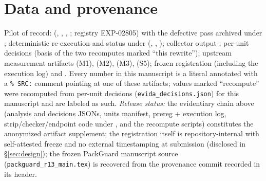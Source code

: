 \documentclass[sigconf,nonacm]{acmart}
\begin{document}
\section*{Data and provenance}
\begin{sloppypar}
Pilot of record: 
(, ,
, ;
registry EXP-02805) with the defective pass archived under
; deterministic re-execution and status under
 (,
, ); collector
output ; per-unit decisions
 (basis of the two recomputes marked ``this
rewrite''); upstream measurement artifacts
 (M1),
 (M2),
 (M3),
 (S5); frozen
registration 
(including the execution log) and . Every
number in this manuscript is a literal annotated with a \texttt{\% SRC:}
comment pointing at one of these artifacts; values marked ``recompute''
were recomputed from per-unit decisions (\texttt{evida\_decisions.json})
for this manuscript and are labeled as such. \emph{Release status:} the
evidentiary chain above (analysis and decisions JSONs, units manifest,
prereg + execution log, strip/checker/endpoint code under
, and the recompute scripts) constitutes the
anonymized artifact supplement; the registration itself is
repository-internal with self-attested freeze and no external
timestamping at submission (disclosed in \S\ref{sec:design}); the frozen
PackGuard manuscript source (\texttt{packguard\_r13\_main.tex}) is
recovered from the provenance commit recorded in its header.
\end{sloppypar}



\end{document}
